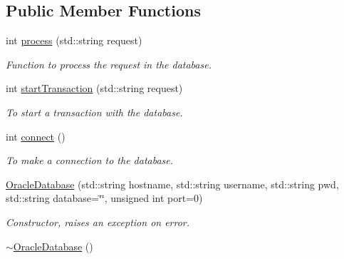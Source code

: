 \subsection*{Public Member Functions}
\begin{DoxyCompactItemize}
\item 
int \hyperlink{classOracleDatabase_ae6515239e0f313896f21b3ec267acdd9}{process} (std::string request)
\begin{DoxyCompactList}\small\item\em Function to process the request in the database. \item\end{DoxyCompactList}\item 
int \hyperlink{classOracleDatabase_a24767193dece017c4e97ca5bce7214e6}{startTransaction} (std::string request)
\begin{DoxyCompactList}\small\item\em To start a transaction with the database. \item\end{DoxyCompactList}\item 
int \hyperlink{classOracleDatabase_a4a93e348aa699fb34d62edc64dc8d5fd}{connect} ()
\begin{DoxyCompactList}\small\item\em To make a connection to the database. \item\end{DoxyCompactList}\item 
\hyperlink{classOracleDatabase_aee0fb586efbd08f76089b1d343ad9345}{OracleDatabase} (std::string hostname, std::string username, std::string pwd, std::string database=\char`\"{}\char`\"{}, unsigned int port=0)
\begin{DoxyCompactList}\small\item\em Constructor, raises an exception on error. \item\end{DoxyCompactList}\item 
\hypertarget{classOracleDatabase_acf0c68ce86bdafbe0ba05304f0039d14}{
\hyperlink{classOracleDatabase_acf0c68ce86bdafbe0ba05304f0039d14}{$\sim$OracleDatabase} ()}
\label{classOracleDatabase_acf0c68ce86bdafbe0ba05304f0039d14}


\end{DoxyCompactItemize}
